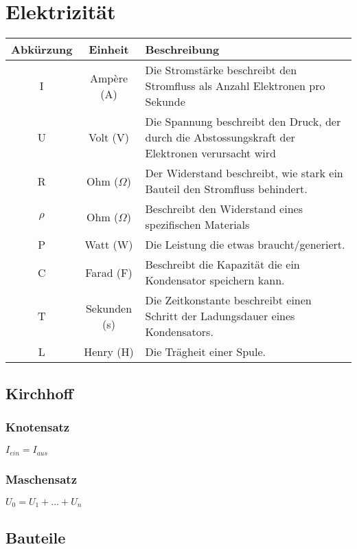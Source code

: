 \documentclass[a4paper]{article}
\author{Philipp Kiss}
\begin{document}
\section*{Elektrizität}
\begin{table}[h!]
		\begin{center}
				\begin{tabular}{|c|c|p{14.7cm}|}
						\hline
						\textbf{Abkürzung} & \textbf{Einheit} & \textbf{Beschreibung} \\
						\hline
						I & Ampère (A)& Die Stromstärke beschreibt den Stromfluss als Anzahl Elektronen pro Sekunde\\
						\hline
						U & Volt (V) & Die Spannung beschreibt den Druck, der durch die Abstossungskraft der Elektronen verursacht wird\\
						\hline
						R & Ohm (\(\Omega\)) & Der Widerstand beschreibt, wie stark ein Bauteil den Stromfluss behindert. \\
						\hline
						\(\rho\) & Ohm (\(\Omega\)) & Beschreibt den Widerstand eines spezifischen Materials\\
						\hline
						P&Watt (W) & Die Leistung die etwas braucht/generiert. \\
						\hline
						C&Farad (F)&Beschreibt die Kapazität die ein Kondensator speichern kann. \\
						\hline
						T&Sekunden (s)& Die Zeitkonstante beschreibt einen Schritt der Ladungsdauer eines Kondensators. \\
						\hline
						L&Henry (H) & Die Trägheit einer Spule. \\
						\hline
				\end{tabular}
		\end{center}
\end{table}

\subsection*{Kirchhoff}
\subsubsection*{Knotensatz} \(
		I_{ein} = I_{aus}
\)
\subsubsection*{Maschensatz} \(
U_0 = U_1 + ... + U_n
\)
\subsection*{Bauteile}
\end{document}
